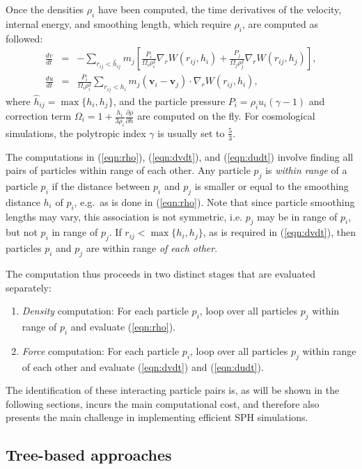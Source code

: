 \documentclass[final]{siamltex}
\newcommand{\eqn}[1]
    {(\ref{eqn:#1})}
\begin{document}
Once the densities $\rho_i$ have been computed,
the time derivatives
of the velocity, internal energy, and smoothing length, which
require $\rho_i$, are computed as followed:
%
\begin{eqnarray}
    \frac{dv}{dt} & = & -\sum_{r_{ij} < \hat{h}_{ij}} m_j \left[
        \frac{P_i}{\Omega_i\rho_i^2}\nabla_rW(r_{ij},h_i) +
        \frac{P_j}{\Omega_j\rho_j^2}\nabla_rW(r_{ij},h_j) \right], \label{eqn:dvdt} \\ 
    \frac{du}{dt} & = & \frac{P_i}{\Omega_i\rho_i^2} \sum_{r_{ij} < h_i} m_j(\mathbf v_i - \mathbf v_j) \cdot \nabla_rW(r_{ij},h_i), \label{eqn:dudt}
\end{eqnarray}
%
where $\hat{h}_{ij} = \max\{h_i,h_j\}$, and the particle pressure
$P_i=\rho_i u_i (\gamma-1)$ and correction term
$\Omega_i=1 + \frac{h_i}{3\rho_i}\frac{\partial \rho}{\partial h}$
are computed on the fly.
For cosmological simulations, the polytropic index $\gamma$ is
usually set to $\frac{5}{3}$.

The computations in \eqn{rho}, \eqn{dvdt}, and \eqn{dudt}
involve finding all pairs of particles
within range of each other.
Any particle $p_j$ is {\em within range} of a particle $p_i$
if the distance between $p_i$ and $p_j$ is smaller or equal
to the smoothing distance $h_i$ of $p_i$, e.g.~as is done in \eqn{rho}.
Note that since particle smoothing lengths may vary, this
association is not symmetric, i.e. $p_j$ may be in range of
$p_i$, but not $p_i$ in range of $p_j$.
If $r_{ij} < \max\{h_i,h_j\}$, as is required in \eqn{dvdt},
then particles $p_i$ and $p_j$ are within range
{\em of each other}.

The computation thus proceeds in two distinct stages that are
evaluated separately:
\begin{enumerate}
    \item {\em Density} computation: For each particle $p_i$,
        loop over all particles $p_j$ within range of $p_i$ and evaluate
        \eqn{rho}.
    \item {\em Force} computation: For each particle $p_i$,
        loop over all particles $p_j$
        within range of each other and evaluate \eqn{dvdt} and \eqn{dudt}.
\end{enumerate}
The identification of these interacting particle pairs is,
as will be shown in the following sections, incurs the main computational
cost, and therefore also presents the main challenge in implementing efficient
SPH simulations.


\subsection{Tree-based approaches}
\end{document}
